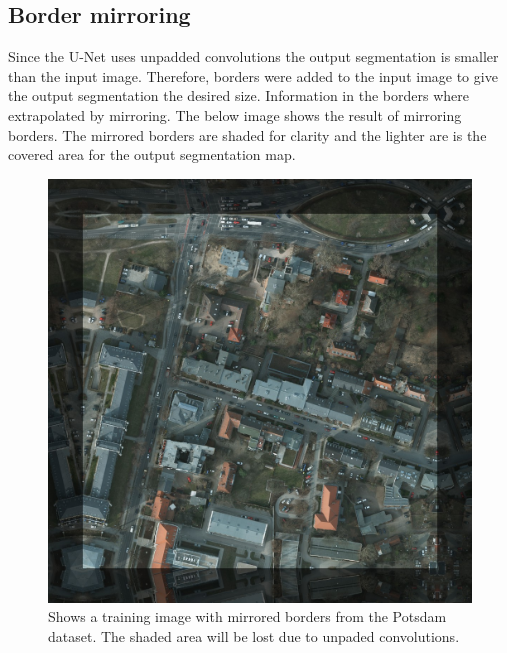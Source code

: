 \documentclass{kththesis}
\begin{document}
\subsection{Border mirroring}
Since the U-Net uses unpadded convolutions the output segmentation is smaller than the input image. Therefore, borders were added to the input image to give the output segmentation the desired size. Information in the borders where extrapolated by mirroring. The below image shows the result of mirroring borders. The mirrored borders are shaded for clarity and the lighter are is the covered area for the output segmentation map.
\begin{figure}[H]
  \centering
      \includegraphics[scale=.8]{borders}
  \caption{Shows a training image with mirrored borders from the Potsdam dataset. The shaded area will be lost due to unpaded convolutions.} \label{fig:vgg}
\end{figure}
\end{document}

